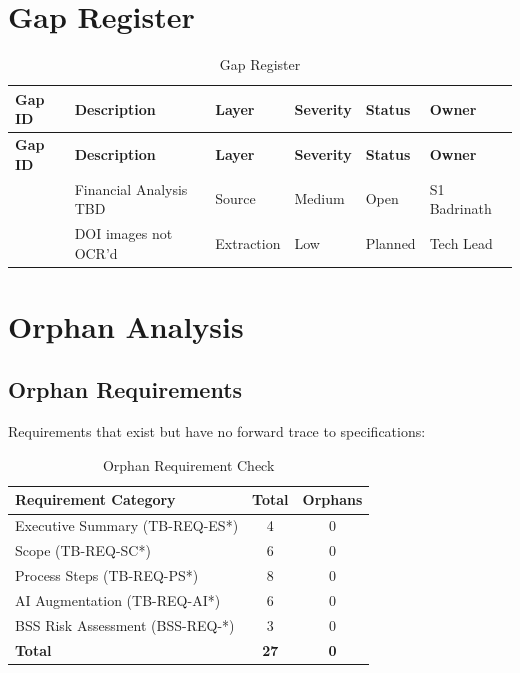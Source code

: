 \section{Gap Register}
\label{sec:gap-register}

\begin{longtable}{@{}C{1.5cm}L{4cm}C{2cm}C{2cm}C{2cm}C{2cm}@{}}
\caption{Gap Register}
\label{tab:gap-register} \\
\toprule
\textbf{Gap ID} & \textbf{Description} & \textbf{Layer} & \textbf{Severity} & \textbf{Status} & \textbf{Owner} \\
\midrule
\endfirsthead
\toprule
\textbf{Gap ID} & \textbf{Description} & \textbf{Layer} & \textbf{Severity} & \textbf{Status} & \textbf{Owner} \\
\midrule
\endhead
{} & Financial Analysis TBD & Source & Medium & Open & S1 Badrinath \\
 & DOI images not OCR'd & Extraction & Low & Planned & Tech Lead \\
\bottomrule
\end{longtable}

\section{Orphan Analysis}
\label{sec:orphan-analysis}

\subsection{Orphan Requirements}

Requirements that exist but have no forward trace to specifications:

\begin{table}[h]
\centering
\caption{Orphan Requirement Check}
\label{tab:orphan-requirements}
\begin{tabular}{@{}lcc@{}}
\toprule
\textbf{Requirement Category} & \textbf{Total} & \textbf{Orphans} \\
\midrule
Executive Summary (TB-REQ-ES*) & 4 & 0 \\
Scope (TB-REQ-SC*) & 6 & 0 \\
Process Steps (TB-REQ-PS*) & 8 & 0 \\
AI Augmentation (TB-REQ-AI*) & 6 & 0 \\
BSS Risk Assessment (BSS-REQ-*) & 3 & 0 \\
\midrule
\textbf{Total} & \textbf{27} & \textbf{0} \\
\bottomrule
\end{tabular}
\end{table}

